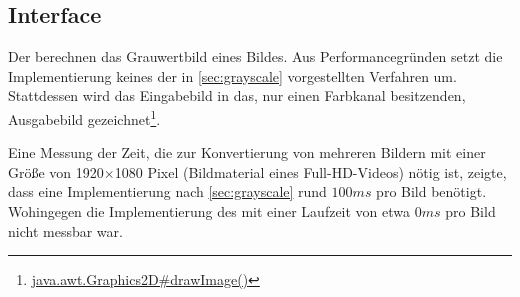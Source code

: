 \subsection*{Interface }
Der  berechnen das Grauwertbild eines Bildes.
Aus Performancegründen setzt die Implementierung  keines der in \autoref{sec:grayscale} vorgestellten Verfahren um.
Stattdessen wird das Eingabebild in das, nur einen Farbkanal besitzenden, Ausgabebild gezeichnet\footnote{\href{http://docs.oracle.com/javase/6/docs/api/java/awt/Graphics2D.html\#drawImage(java.awt.image.BufferedImage, java.awt.image.BufferedImageOp, int, int)}{java.awt.Graphics2D\#drawImage()}}.

Eine Messung der Zeit, die zur Konvertierung von mehreren Bildern mit einer Größe von 1920$\times$1080 Pixel (Bildmaterial eines Full-HD-Videos) nötig ist, zeigte, dass eine Implementierung nach \autoref{sec:grayscale} rund $100\unit{ms}$ pro Bild benötigt.
Wohingegen die Implementierung des  mit einer Laufzeit von etwa $0\unit{ms}$ pro Bild nicht messbar war.

